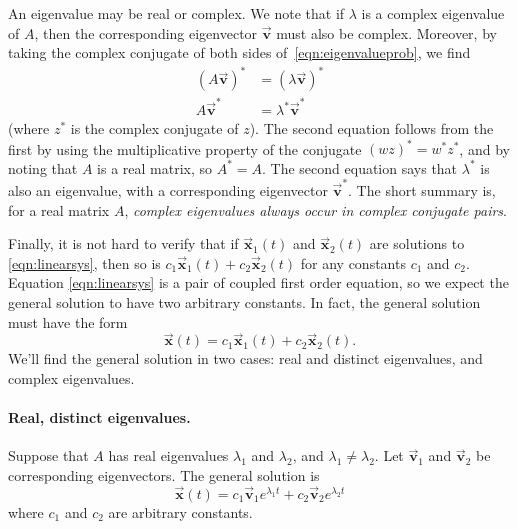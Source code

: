 \documentclass{book}
\newcommand{\BV}{\vec{\textbf{v}}}
\newcommand{\BX}{\vec{\textbf{x}}}
\begin{document}
An eigenvalue may be real or complex. We note that
if $\lambda$ is a complex eigenvalue of $A$, then
the corresponding eigenvector $\BV$ must also be
complex. Moreover, by taking the complex conjugate
of both sides of~\eqref{eqn:eigenvalueprob},
we find
\begin{equation}
\begin{split}
   (A\BV)^* & = (\lambda \BV)^* \\
   A\BV^* & = \lambda^* \BV^*
\end{split}
\end{equation}
(where $z^*$ is the complex conjugate of $z$).
The second equation follows from the first
by using the multiplicative property of the conjugate
$(wz)^* = w^* z^*$, and
by noting that
$A$ is a real matrix, so $A^*=A$.
The second equation says that $\lambda^*$ is also an eigenvalue,
with a corresponding eigenvector $\BV^*$.
The short summary is, for a real matrix $A$,
\emph{complex eigenvalues always occur in complex conjugate
pairs}.

Finally, it is not hard to verify that if $\BX_1(t)$ and
$\BX_2(t)$ are solutions to \eqref{eqn:linearsys}, then
so is $c_1 \BX_1(t) + c_2\BX_2(t)$ for any constants
$c_1$ and $c_2$.  Equation \eqref{eqn:linearsys} is
a pair of coupled first order equation, so we expect the
general solution to have two arbitrary constants.
In fact, the general solution must have the form
\begin{equation}
  \BX(t) = c_1 \BX_1(t) + c_2 \BX_2(t).
\end{equation}
We'll find the general solution in two cases: real and distinct eigenvalues,
and complex eigenvalues.

\paragraph{Real, distinct eigenvalues.}
Suppose that $A$ has real eigenvalues $\lambda_1$
and $\lambda_2$, and $\lambda_1 \ne \lambda_2$.
Let $\BV_1$ and $\BV_2$ be corresponding eigenvectors.
The general solution is
\begin{equation}
  \BX(t) = c_1 \BV_1 e^{\lambda_1 t} + c_2 \BV_2 e^{\lambda_2 t}
\label{eqn:gensolreal}
\end{equation}
where $c_1$ and $c_2$ are arbitrary constants.
\end{document}

